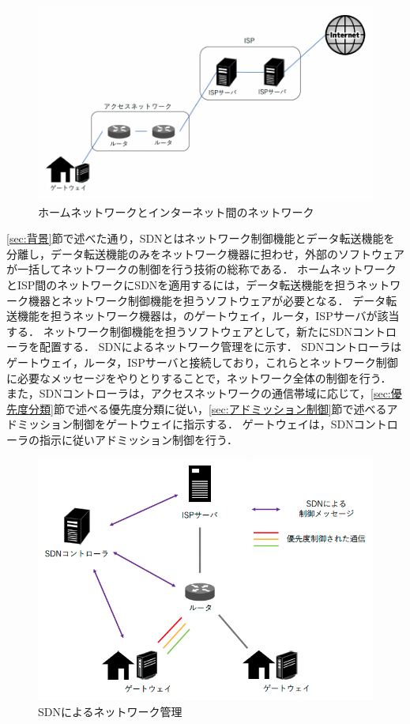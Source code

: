 \documentclass[a4paper,11pt,uplatex]{ujreport}
\begin{document}
  \begin{figure}[!tb]
    \centering
    \includegraphics[width=\linewidth]{img/ISP.png}
    \caption{ホームネットワークとインターネット間のネットワーク}
    \label{fig:ISP}
  \end{figure}

  \ref{sec:背景}節で述べた通り，SDNとはネットワーク制御機能とデータ転送機能を分離し，データ転送機能のみをネットワーク機器に担わせ，外部のソフトウェアが一括してネットワークの制御を行う技術の総称である．
  ホームネットワークとISP間のネットワークにSDNを適用するには，データ転送機能を担うネットワーク機器とネットワーク制御機能を担うソフトウェアが必要となる．
  データ転送機能を担うネットワーク機器は，のゲートウェイ，ルータ，ISPサーバが該当する．
  ネットワーク制御機能を担うソフトウェアとして，新たにSDNコントローラを配置する．
  SDNによるネットワーク管理をに示す．
  SDNコントローラはゲートウェイ，ルータ，ISPサーバと接続しており，これらとネットワーク制御に必要なメッセージをやりとりすることで，ネットワーク全体の制御を行う．
  また，SDNコントローラは，アクセスネットワークの通信帯域に応じて，\ref{sec:優先度分類}節で述べる優先度分類に従い，\ref{sec:アドミッション制御}節で述べるアドミッション制御をゲートウェイに指示する．
  ゲートウェイは，SDNコントローラの指示に従いアドミッション制御を行う．\par

  \begin{figure}[!tb]
    \centering
    \includegraphics[width=\linewidth]{img/proposal.png}
    \caption{SDNによるネットワーク管理}
    \label{fig:proposal}
  \end{figure}
\end{document}

